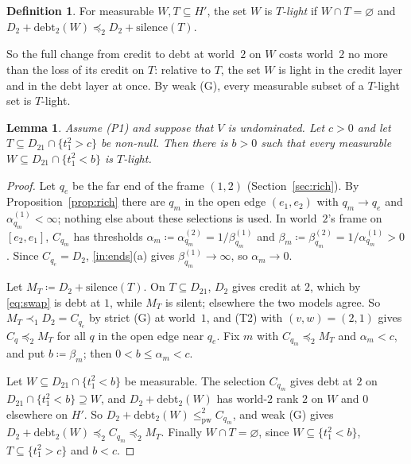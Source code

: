 \documentclass[11pt]{article}
\newtheorem{lemma}[theorem]{Lemma}
\theoremstyle{definition}\newtheorem{definition}[theorem]{Definition}
\theoremstyle{remark}\newtheorem{remark}[theorem]{Remark}
\newcommand{\debt}{\mathrm{debt}}
\newcommand{\sil}{\mathrm{silence}}
\newcommand{\pw}{\mathrm{pw}}
\begin{document}
\begin{definition}\label{def:light}
For measurable $W,T\subseteq H'$, the set $W$ is \emph{$T$-light} if
$W\cap T=\varnothing$ and $D_2+\debt_2(W)\preceq_2D_2+\sil(T)$.
\end{definition}

So the full change from credit to debt at world~$2$ on $W$ costs world~$2$
no more than the loss of its credit on $T$: relative to $T$, the set $W$ is
light in the credit layer and in the debt layer at once. By weak (G),
every measurable subset of a $T$-light set is $T$-light.

\begin{lemma}\label{lem:near}
Assume (P1) and suppose that $V$ is undominated. Let $c>0$ and let
$T\subseteq D_{21}\cap\{t^2_1>c\}$ be non-null. Then there is $b>0$ such
that every measurable $W\subseteq D_{21}\cap\{t^2_1<b\}$ is $T$-light.
\end{lemma}
\begin{proof}
Let $q_e$ be the far end of the frame $(1,2)$ (Section~\ref{sec:rich}). By
Proposition~\ref{prop:rich} there are $q_m$ in the open edge $(e_1,e_2)$
with $q_m\to q_e$ and $\alpha^{(1)}_{q_m}<\infty$; nothing else about these
selections is used. In world~$2$'s frame on $[e_2,e_1]$, $C_{q_m}$ has
thresholds $\alpha_m\coloneqq\alpha^{(2)}_{q_m}=1/\beta^{(1)}_{q_m}$ and
$\beta_m\coloneqq\beta^{(2)}_{q_m}=1/\alpha^{(1)}_{q_m}>0$. Since
$C_{q_e}=D_2$, \ref{in:ends}(a) gives $\beta^{(1)}_{q_m}\to\infty$, so
$\alpha_m\to0$.

Let $M_T\coloneqq D_2+\sil(T)$. On $T\subseteq D_{21}$, $D_2$ gives credit
at $2$, which by \eqref{eq:swap} is debt at $1$, while $M_T$ is silent;
elsewhere the two models agree. So $M_T\prec_1D_2=C_{q_e}$ by strict (G) at
world~$1$, and (T2) with $(v,w)=(2,1)$ gives $C_q\preceq_2M_T$ for all $q$ in
the open edge near $q_e$. Fix $m$ with $C_{q_m}\preceq_2M_T$ and
$\alpha_m<c$, and put $b\coloneqq\beta_m$; then $0<b\le\alpha_m<c$.

Let $W\subseteq D_{21}\cap\{t^2_1<b\}$ be measurable. The selection
$C_{q_m}$ gives debt at $2$ on $D_{21}\cap\{t^2_1<b\}\supseteq W$, and
$D_2+\debt_2(W)$ has world-$2$ rank $2$ on $W$ and $0$ elsewhere on $H'$.
So $D_2+\debt_2(W)\le^2_\pw C_{q_m}$, and weak (G) gives
$D_2+\debt_2(W)\preceq_2C_{q_m}\preceq_2M_T$. Finally $W\cap T=\varnothing$,
since $W\subseteq\{t^2_1<b\}$, $T\subseteq\{t^2_1>c\}$ and $b<c$.
\end{proof}
\end{document}
